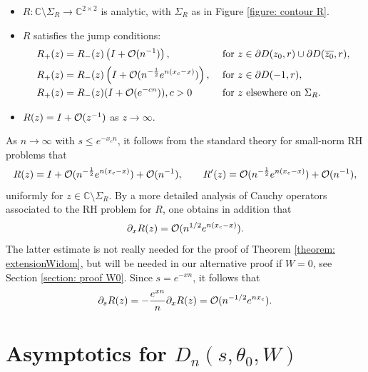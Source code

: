 \documentclass[11pt,fleqn]{article}
\numberwithin{equation}{section}
\def\bigO{{\cal O}}
\begin{document}
\begin{itemize}
\item[(a)] $R : \mathbb{C} \setminus \Sigma_{R} \to \mathbb{C}^{2\times 2}$ is analytic, with $\Sigma_R$ as in Figure \ref{figure: contour R}.
\item[(b)] $R$ satisfies the jump conditions:
\begin{equation*}
\begin{array}{l l}
\displaystyle R_{+}(z) = R_{-}(z) \left(I + \bigO(n^{-1})\right), & \mbox{ for } z \in \partial D(z_{0},r) \cup \partial D(\overline{z_{0}},r), \\[0.2cm]

\displaystyle R_{+}(z) = R_{-}(z) \left(I + \bigO(n^{-\frac{1}{2}}e^{n(x_c-x)})\right), & \mbox{ for } z \in \partial D(-1,r), \\[0.2cm]

\displaystyle R_{+}(z) = R_{-}(z) (I+\bigO(e^{-cn})), c>0 & \mbox{ for } z \mbox{ elsewhere on } \Sigma_{R}.

\end{array}
\end{equation*}
\item[(c)] $R(z) = I + \bigO(z^{-1})$ as $z \to \infty$.
\end{itemize}
As $n\to\infty$ with $s\leq e^{-x_cn}$, it follows from the standard theory for small-norm RH problems that \begin{equation}R(z) = I + \bigO(n^{-\frac{1}{2}}e^{n(x_c-x)})+\bigO(n^{-1}),\qquad R^{\prime}(z) = \bigO(n^{-\frac{1}{2}}e^{n(x_c-x)})+\bigO(n^{-1}),\label{as R}
\end{equation}
uniformly for $z \in \mathbb{C}\setminus \Sigma_{R}$.
By a more detailed analysis of Cauchy operators associated to the RH problem for $R$, one obtains in addition that
\begin{equation}\label{dxR}
\partial_x R(z)=\bigO(n^{1/2}e^{n(x_c-x)}).
\end{equation}
The latter estimate is not really needed for the proof of Theorem \ref{theorem: extensionWidom}, but will be needed in our alternative proof if $W=0$, see Section \ref{section: proof W0}.
Since $s=e^{-xn}$, it follows that 
\begin{equation}\label{dsR}
\partial_s R(z)=-\frac{e^{xn}}{n}\partial_x R(z)=\bigO(n^{-1/2}e^{nx_c}).
\end{equation}


\section{Asymptotics for $D_n(s,\theta_0,W)$}\label{section: int}
\end{document}
